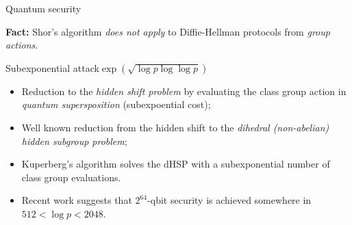 \documentclass[aspectratio=169]{beamer}
\begin{document}
\begin{frame}{Quantum security}

  \textbf{Fact:} Shor's algorithm \emph{does not apply} to Diffie-Hellman
  protocols from \emph{group actions}.

  \begin{block}{Subexponential attack\hfill\emph{$\exp(\sqrt{\log p\log\log p})$}}
    \begin{itemize}
    \item Reduction to the \emph{hidden shift problem} by evaluating
      the class group action in \emph{quantum
        supersposition} (subexpoential cost);
    \item Well known reduction from the hidden shift to the
      \emph{dihedral (non-abelian) hidden subgroup problem};
    \item Kuperberg's algorithm solves the dHSP with a subexponential
      number of class group evaluations.
    \item Recent work suggests that $2^{64}$-qbit security is achieved
      somewhere in $512 < \log p < 2048$.
    \end{itemize}
  \end{block}
\end{frame}

\end{document}
